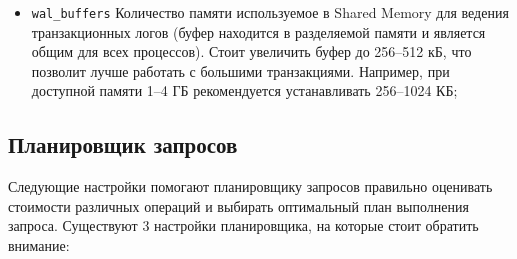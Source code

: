 \begin{itemize}
  \item \lstinline!wal_buffers! Количество памяти используемое в Shared Memory для ведения транзакционных логов (буфер находится в разделяемой памяти и является общим для всех процессов). Стоит увеличить буфер до 256--512 кБ, что позволит лучше работать с большими транзакциями. Например, при доступной памяти 1--4 ГБ рекомендуется устанавливать 256--1024 КБ;
\end{itemize}


\subsection{Планировщик запросов}


Следующие настройки помогают планировщику запросов правильно оценивать стоимости различных операций и выбирать оптимальный план выполнения запроса. Существуют 3 настройки планировщика, на которые стоит обратить внимание:

